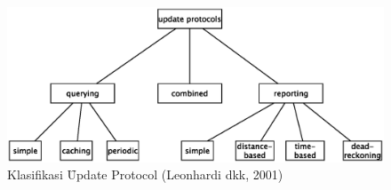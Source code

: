 \noindent
\begin{figure}
  \centering
  \includegraphics[scale=0.60]
  {images/2-klasifikasi}
\caption{Klasifikasi \f{Update Protocol} (Leonhardi dkk, 2001)}
\label{fig:update_protocols}
\end{figure}







